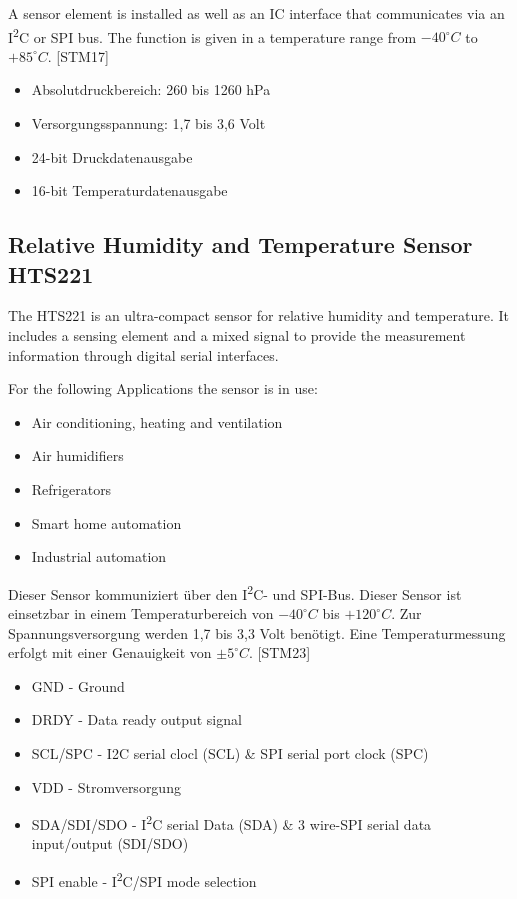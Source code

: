 A sensor element is installed as well as an IC interface that communicates via an I\textsuperscript{2}C or SPI bus. The function is given in a temperature range from $-40^\circ C$ to $+85^\circ C$. [STM17]

\begin{itemize}
    \item Absolutdruckbereich: 260 bis 1260 hPa
    \item Versorgungsspannung: 1,7 bis 3,6 Volt
    \item 24-bit Druckdatenausgabe
    \item 16-bit Temperaturdatenausgabe
\end{itemize}

\subsection{Relative Humidity and Temperature Sensor HTS221}
The HTS221 is an ultra-compact sensor for relative humidity and temperature. It includes a sensing element and a mixed signal to provide the measurement information through digital serial interfaces.

For the following Applications the sensor is in use:


\begin{itemize}
    \item Air conditioning, heating and ventilation 
    \item Air humidifiers
    \item Refrigerators
    \item Smart home automation
    \item Industrial automation
\end{itemize}  

Dieser Sensor kommuniziert über den I\textsuperscript{2}C- und SPI-Bus. Dieser Sensor ist einsetzbar in einem Temperaturbereich
von $-40^\circ C$ bis $+120^\circ C$. Zur Spannungsversorgung werden 1,7 bis 3,3 Volt benötigt. Eine Temperaturmessung erfolgt mit einer Genauigkeit von $\pm 5^\circ C$. [STM23]

\begin{itemize}
    \item GND - Ground
    \item DRDY - Data ready output signal
    \item SCL/SPC - I2C serial clocl (SCL) \& SPI serial port clock (SPC)
    \item VDD - Stromversorgung
    \item SDA/SDI/SDO - I\textsuperscript{2}C serial Data (SDA) \& 3 wire-SPI serial data input/output (SDI/SDO)
    \item SPI enable - I\textsuperscript{2}C/SPI mode selection
\end{itemize}

